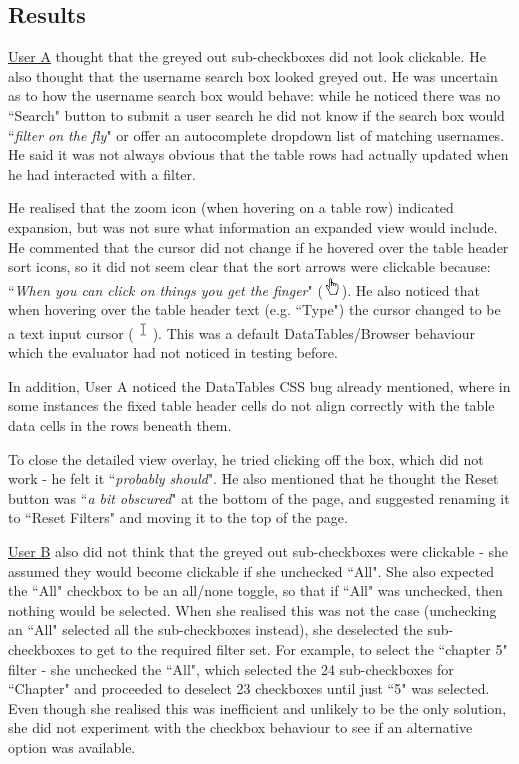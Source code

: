 \subsection{Results}
\underline{User A} thought that the greyed out sub-checkboxes did not look clickable. He also thought that the username search box looked greyed out. He was uncertain as to how the username search box would behave: while he noticed there was no ``Search" button to submit a user search he did not know if the search box would ``\textit{filter on the fly}" or offer an autocomplete dropdown list of matching usernames. He said it was not always obvious that the table rows had actually updated when he had interacted with a filter.

He realised that the zoom icon (when hovering on a table row) indicated expansion, but was not sure what information an expanded view would include. He commented that the cursor did not change if he hovered over the table header sort icons, so it did not seem clear that the sort arrows were clickable because: ``\textit{When you can click on things you get the finger}" (\includegraphics[width=0.5cm]{Figures/handcursor.png}). He also noticed that when hovering over the table header text (e.g. ``Type") the cursor changed to be a text input cursor (\includegraphics[width=0.5cm]{Figures/textcursor.png}). This was a default DataTables/Browser behaviour which the evaluator had not noticed in testing before.

In addition, User A noticed the DataTables CSS bug already mentioned, where in some instances the fixed table header cells do not align correctly with the table data cells in the rows beneath them.

To close the detailed view overlay, he tried clicking off the box, which did not work - he felt it ``\textit{probably should}". He also mentioned that he thought the Reset button was ``\textit{a bit obscured}" at the bottom of the page, and suggested renaming it to ``Reset Filters" and moving it to the top of the page. 

\underline{User B} also did not think that the greyed out sub-checkboxes were clickable - she assumed they would become clickable if she unchecked ``All". She also expected the ``All" checkbox to be an all/none toggle, so that if ``All" was unchecked, then nothing would be selected. When she realised this was not the case (unchecking an ``All" selected all the sub-checkboxes instead), she deselected the sub-checkboxes to get to the required filter set. For example, to select the ``chapter 5" filter - she unchecked the ``All", which selected the 24 sub-checkboxes for ``Chapter" and proceeded to deselect 23 checkboxes until just ``5" was selected. Even though she realised this was inefficient and unlikely to be the only solution, she did not experiment with the checkbox behaviour to see if an alternative option was available. 

